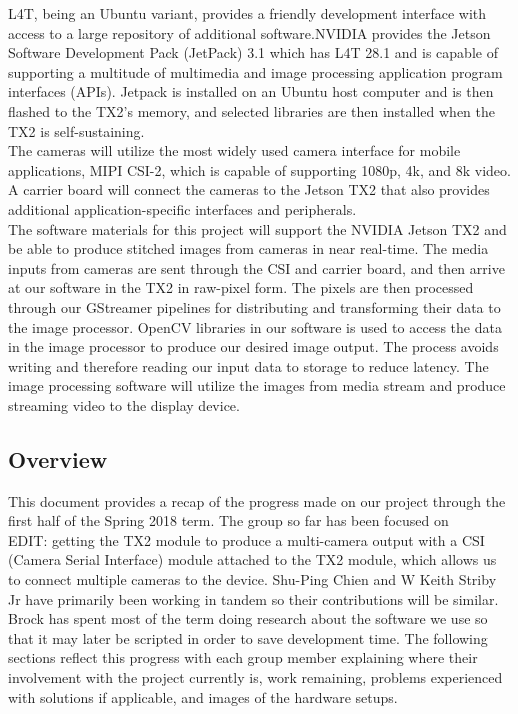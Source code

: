 \documentclass[letterpaper,10pt,serif,draftclsnofoot,onecolumn,compsoc,titlepage]{IEEEtran}
\begin{document}
L4T, being an Ubuntu variant, provides a friendly development interface with 
access to a large repository of additional software.NVIDIA provides the Jetson 
Software Development Pack (JetPack) 3.1 which has L4T 28.1 
and is capable of supporting a multitude of multimedia and image processing 
application program interfaces (APIs). Jetpack 
is installed on an Ubuntu host computer and is then flashed to the TX2's memory, and 
selected libraries are then installed when the TX2 is self-sustaining. \\

The cameras will utilize the most widely used camera interface for mobile applications, 
MIPI CSI-2, which is capable of supporting 1080p, 4k, and 8k video. 
A carrier board will connect the cameras to the Jetson TX2 that also provides 
additional application-specific interfaces and peripherals. \\

The software materials for this project will support the NVIDIA Jetson TX2 and 
be able to produce stitched images from cameras in near real-time. The media inputs 
from cameras are sent through  the CSI and carrier board, and then arrive at our 
software in the TX2 in raw-pixel form. The pixels are then processed through our 
GStreamer pipelines for distributing and transforming their data to the image 
processor. OpenCV libraries in our software is used to access the data in the image 
processor to produce our desired image output. The process avoids writing and 
therefore reading our input data to storage to reduce latency. The image processing 
software will utilize the images from media stream and produce streaming video 
to the display device.  \\

\subsection{Overview}

This document provides a recap of the progress made on our project through the first half
of the Spring 2018 term. The group so far has been focused on \\

EDIT:
getting the TX2 module to produce a multi-camera output with a CSI (Camera Serial Interface) module attached to the TX2 module, which allows us to connect multiple cameras to the device.
Shu-Ping Chien and W Keith Striby Jr have primarily been working in tandem so their 
contributions will be similar. Brock has spent most of the term doing research about the software we use so that it may later be scripted in order to save development time. The following 
sections reflect this progress with each group member explaining where their involvement 
with the project currently is, work remaining, problems experienced 
with solutions if applicable, and images of the hardware setups. \\ 
\end{document}
